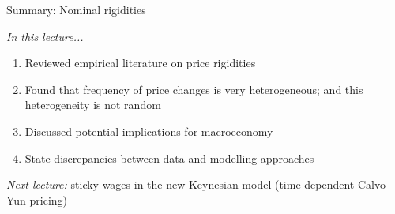 \documentclass{beamer}
\newcommand{\tb}[1]{{\color{dblue}{\textbf{#1}}}}
\begin{document}
\begin{frame}{Summary:
 Nominal rigidities}

\emph{In this lecture...}

\begin{enumerate}
\item Reviewed empirical literature on price rigidities
\item Found that frequency of price changes is very heterogeneous; and this heterogeneity is not random
\item Discussed potential implications for macroeconomy
\item State discrepancies between data and modelling approaches 
\end{enumerate}

\emph{Next lecture:} sticky wages in the new Keynesian model (time-dependent Calvo-Yun pricing)

\end{frame}
\begin{frame}

\vspace{10mm}
\begin{center}
{\Large
\tb{Thank you.}\\
}
\vspace{10mm}
\footnotesize{
{
}}
\end{center}

\end{frame}
\end{document}
